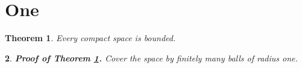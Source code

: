\documentclass{article}
\newtheorem{thm}{Theorem}[section]
\newtheorem{subsec}[thm]{}
\begin{document}
\section{One}
\begin{thm}\label{a} Every compact space is bounded. \end{thm}

\begin{subsec} {\bf Proof of Theorem \ref{a}.} Cover the space by finitely
many balls of radius one.
\end{subsec}
\end{document}
